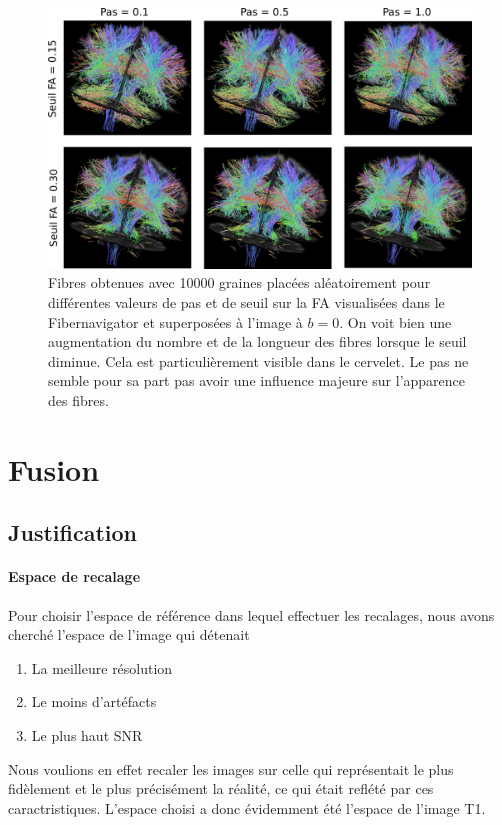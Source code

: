 \documentclass[a4paper]{article}
\begin{document}
\begin{figure}
\begin{center}
\includegraphics[scale=.3]{tracking}
\caption{Fibres obtenues avec 10000 graines placées aléatoirement pour différentes valeurs de pas et de seuil sur la FA visualisées dans le Fibernavigator et superposées à l'image à $b=0$. On voit bien une augmentation du nombre et de la longueur des fibres lorsque le seuil diminue. Cela est particulièrement visible dans le cervelet. Le pas ne semble pour sa part pas avoir une influence majeure sur l'apparence des fibres. \label{tracking}}
\end{center}
\end{figure}

\section{Fusion}

\subsection{Justification}
\paragraph{Espace de recalage}Pour choisir l'espace de référence dans lequel effectuer les recalages, nous avons cherché l'espace de l'image qui détenait
\begin{enumerate}
\item La meilleure résolution
\item Le moins d'artéfacts
\item Le plus haut SNR
\end{enumerate}
Nous voulions en effet recaler les images sur celle qui représentait le plus fidèlement et le plus précisément la réalité, ce qui était reflété par ces caractristiques. L'espace choisi a donc évidemment été l'espace de l'image T1.
\end{document}
